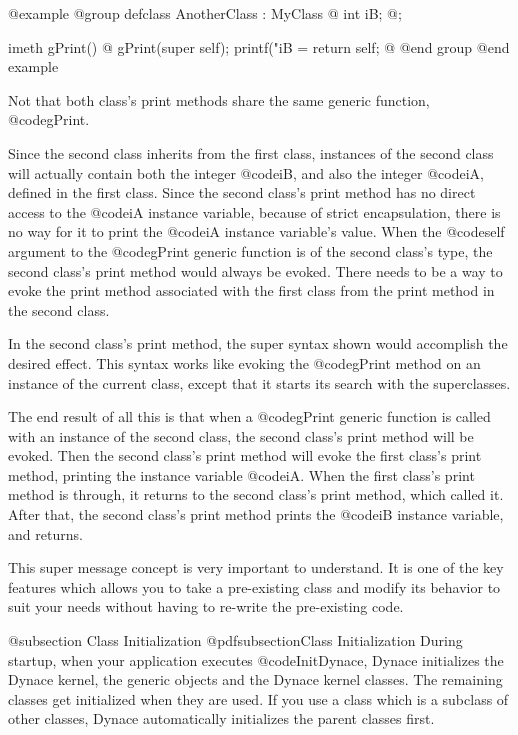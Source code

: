 @example
@group
defclass  AnotherClass : MyClass  @{
        int     iB;
@};

imeth   gPrint()
@{
        gPrint(super self);
        printf("iB = %
        return self;
@}
@end group
@end example

Not that both class's print methods share the same generic function,
@code{gPrint}.

Since the second class inherits from the first class, instances of the
second class will actually contain both the integer @code{iB}, and also
the integer @code{iA}, defined in the first class.  Since the second
class's print method has no direct access to the @code{iA} instance
variable, because of strict encapsulation, there is no way for it to
print the @code{iA} instance variable's value.  When the @code{self}
argument to the @code{gPrint} generic function is of the second class's
type, the second class's print method would always be evoked.  There needs
to be a way to evoke the print method associated with the first class from
the print method in the second class.

In the second class's print method, the super syntax shown would
accomplish the desired effect.  This syntax works like evoking the
@code{gPrint} method on an instance of the current class, except that it
starts its search with the superclasses.

The end result of all this is that when a @code{gPrint} generic function is
called with an instance of the second class, the second class's print method
will be evoked.  Then the second class's print method will evoke the first
class's print method, printing the instance variable @code{iA}.  When the
first class's print method is through, it returns to the second class's
print method, which called it.  After that, the second class's print
method prints the @code{iB} instance variable, and returns.

This super message concept is very important to understand.  It is one
of the key features which allows you to take a pre-existing class and
modify its behavior to suit your needs without having to re-write the
pre-existing code.

@subsection Class Initialization
@pdfsubsection{Class Initialization}
During startup, when your application executes @code{InitDynace},
Dynace initializes the Dynace kernel, the generic objects and
the Dynace kernel classes.  The remaining classes get initialized
when they are used.  If you use a class which is a subclass of
other classes, Dynace automatically initializes the parent classes
first.

